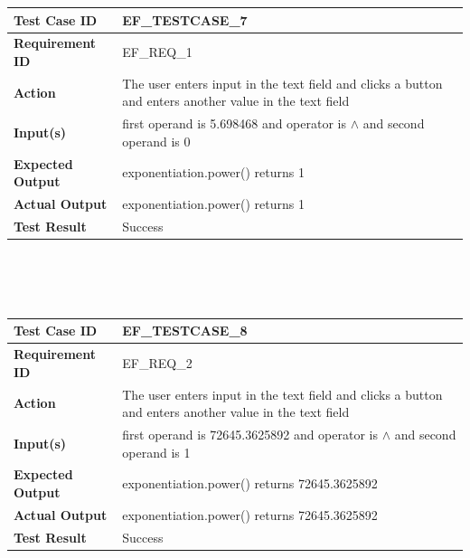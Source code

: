\documentclass[11pt, english]{report}
\begin{document}
\setlength{\tabcolsep}{18pt}
\renewcommand{\arraystretch}{1.5}
\begin{tabular}{ |p{4cm}|p{8cm}| }
\hline
\textbf{Test Case ID} &  EF\_TESTCASE\_7 \\ \hline 
\textbf{Requirement ID} & EF\_REQ\_1\\ \hline
\textbf{Action} & The user enters input in the text field and clicks a button and enters another value in the text field\\ \hline
\textbf{Input(s)} & first operand is 5.698468 and operator is $\wedge$ and second operand is 0 \\ \hline
\textbf{Expected Output} & exponentiation.power() returns 1 \\ \hline
\textbf{Actual Output} & exponentiation.power() returns 1 \\ \hline
\textbf{Test Result} & Success \\ 
\hline
\end{tabular} \\ \\ \\

\setlength{\tabcolsep}{18pt}
\renewcommand{\arraystretch}{1.5}
\begin{tabular}{ |p{4cm}|p{8cm}| }
\hline
\textbf{Test Case ID} &  EF\_TESTCASE\_8 \\ \hline 
\textbf{Requirement ID} & EF\_REQ\_2\\ \hline
\textbf{Action} & The user enters input in the text field and clicks a button and enters another value in the text field\\ \hline
\textbf{Input(s)} & first operand is 72645.3625892 and operator is $\wedge$ and second operand is 1 \\ \hline
\textbf{Expected Output} & exponentiation.power() returns 72645.3625892 \\ \hline
\textbf{Actual Output} & exponentiation.power() returns 72645.3625892 \\ \hline
\textbf{Test Result} & Success \\ 
\hline
\end{tabular} \\ \\ \\
\end{document}
